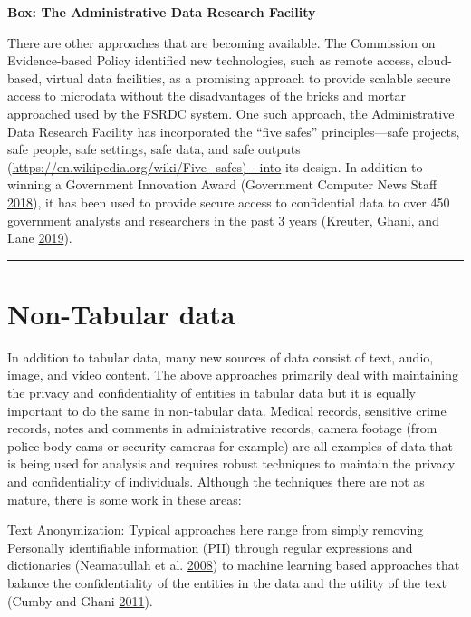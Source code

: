 \documentclass[]{krantz}
\begin{document}
\textbf{Box: The Administrative Data Research Facility}

There are other approaches that are becoming available. The Commission
on Evidence-based Policy identified new technologies, such as remote
access, cloud-based, virtual data facilities, as a promising approach to
provide scalable secure access to microdata without the disadvantages of
the bricks and mortar approached used by the FSRDC system. One such
approach, the Administrative Data Research Facility has incorporated the
``five safes'' principles---safe projects, safe people, safe settings,
safe data, and safe outputs
(\url{https://en.wikipedia.org/wiki/Five_safes)---into} its design. In
addition to winning a Government Innovation Award (Government Computer
News Staff
\protect\hyperlink{ref-GovernmentComputerNewsStaff2018}{2018}), it has
been used to provide secure access to confidential data to over 450
government analysts and researchers in the past 3 years (Kreuter, Ghani,
and Lane \protect\hyperlink{ref-Kreuter2019Change}{2019}).

\begin{center}\rule{0.5\linewidth}{\linethickness}\end{center}

\section{Non-Tabular data}\label{non-tabular-data}

In addition to tabular data, many new sources of data consist of text,
audio, image, and video content. The above approaches primarily deal
with maintaining the privacy and confidentiality of entities in tabular
data but it is equally important to do the same in non-tabular data.
Medical records, sensitive crime records, notes and comments in
administrative records, camera footage (from police body-cams or
security cameras for example) are all examples of data that is being
used for analysis and requires robust techniques to maintain the privacy
and confidentiality of individuals. Although the techniques there are
not as mature, there is some work in these areas:

Text Anonymization: Typical approaches here range from simply removing
Personally identifiable information (PII) through regular expressions
and dictionaries (Neamatullah et al.
\protect\hyperlink{ref-Neamatullah2008}{2008}) to machine learning based
approaches that balance the confidentiality of the entities in the data
and the utility of the text (Cumby and Ghani
\protect\hyperlink{ref-Cumby2011}{2011}).
\end{document}
